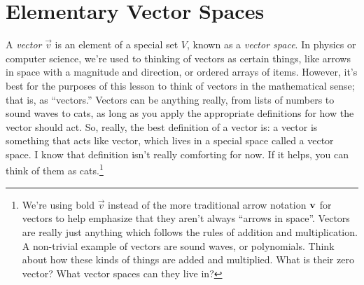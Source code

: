 \chapter{Elementary Vector Spaces}\label{chap:elem_vec_spaces}

A \emph{vector} $\vec{v}$ is an element of a special set $V$, known as a \emph{vector space}. In physics or computer science, we're used to thinking of vectors as certain things, like arrows in space with a magnitude and direction, or ordered arrays of items. However, it's best for the purposes of this lesson to think of vectors in the mathematical sense; that is, as ``vectors.''
Vectors can be anything really, from lists of numbers to sound waves to cats, as long as you apply the appropriate definitions for how the vector should act.
So, really, the best definition of a vector is: a vector is something that acts like vector, which lives in a special space called a vector space. I know that definition isn't really comforting for now. If it helps, you can think of them as cats.\footnote{We're using bold $\vec{v}$ instead of the more traditional arrow notation $\varr{v}$ for vectors to help emphasize that they aren't always ``arrows in space''. Vectors are really just anything which follows the rules of addition and multiplication. A non-trivial example of vectors are sound waves, or polynomials. Think about how these kinds of things are added and multiplied. What is their zero vector? What vector spaces can they live in?}

